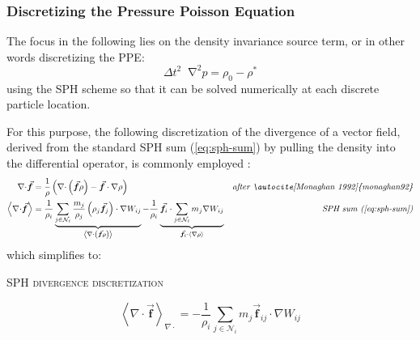 \documentclass[oneside, a4paper]{book}
\newcommand{\equationnamed}[2]{%
  \setlength{\fboxsep}{2pt} %
  \setlength{\fboxrule}{0.01pt}
  \begin{center}
    \begin{minipage}{\textwidth}
      \begin{center}\textsc{#1}\end{center}
      #2
    \end{minipage}
  \end{center}
}
\newcommand\angled[1]{\left\langle#1\right\rangle}
\newcommand*\Laplace{\mathop{}\!\mathbin\nabla^2}
\newcommand\vek[1]{\vec{\bm{#1}}}
\newcommand\br[1]{\left(#1\right)}
\newcommand\divergence{{\nabla\cdot}}
\begin{document}
    
    \subsubsection{Discretizing the Pressure Poisson Equation}
    The focus in the following lies on the density invariance source term, or in other words discretizing the PPE:
    \begin{equation}
      \Delta t^2 \Laplace p = \rho_0-\rho^*
    \end{equation}
    using the SPH scheme so that it can be solved numerically at each discrete particle location.

    For this purpose, the following discretization of the divergence of a vector field, derived from the standard SPH sum (\autoref{eq:sph-sum}) by pulling the density into the differential operator, is commonly employed \autocites{monaghan92}{2014-survey-state-of-the-art-sph}: 
    \begin{align}
      \divergence \vek{f}&= \frac{1}{\rho}\br{\divergence \br{\vek{f}\rho} - \vek{f}\cdot\nabla\rho}
      &\textit{after \autocite[Monaghan 1992]{monaghan92}}\\
      \angled{\divergence \vek{f}} &= \frac{1}{\rho_i} \underbrace{\sum_{j\in\mathcal{N}_i}  \frac{m_j}{\rho_j} \br{\rho_j\vek{f}_j} \cdot \nabla W_{ij}}_{\angled{\divergence \br{\vek{f}\rho}}}
        - \frac{1}{\rho_i} \underbrace{\vek{f}_i \cdot \sum_{j\in\mathcal{N}_i}  m_j \nabla W_{ij}}_{\vek{f}_i\cdot \angled{\nabla\rho}}&\textit{SPH sum (\autoref{eq:sph-sum})}
    \end{align}
    which simplifies to:
    \equationnamed{SPH divergence discretization}{
      \begin{equation}
        \angled{\divergence \vek{f}}_{\divergence} = 
        -\frac{1}{\rho_i} \sum_{j\in\mathcal{N}_i}  
          m_j\vek{f}_{ij}\cdot\nabla W_{ij}
        \label{eq:sph-divergence}
      \end{equation}  
    }
\end{document}
